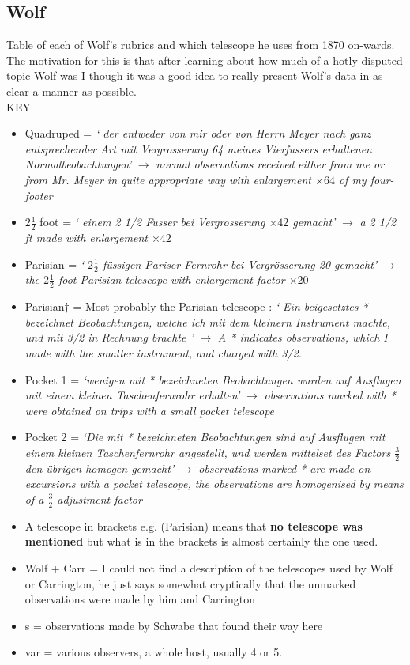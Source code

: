 \documentclass[12pt]{article}
\begin{document}
\subsection{Wolf}
Table of each of Wolf's rubrics and which telescope he uses from 1870 on-wards. The motivation for this is that after learning about how much of a hotly disputed topic Wolf was I though it was a good idea to really present Wolf's data in as clear a manner as possible.\\

KEY\\
\begin{itemize}[\ddagger]
    \item Quadruped = \textit{` der entweder von mir oder von Herrn Meyer nach ganz entsprechender Art mit Vergrosserung 64 meines Vierfussers erhaltenen Normalbeobachtungen'} $\longrightarrow$ \textit{normal observations received either from me or from Mr. Meyer in quite appropriate way with enlargement $\times 64$ of my four-footer}
    \item $2\frac{1}{2}$ foot = \textit{` einem 2 1/2 Fusser bei Vergrosserung $\times 42$ gemacht'} $\longrightarrow$ \textit{a 2 1/2 ft made with enlargement $\times 42$}
    \item Parisian = \textit{` $2\frac{1}{2}$ füssigen Pariser-Fernrohr bei Vergrösserung 20 gemacht'} $\longrightarrow$ \textit{the $2\frac{1}{2}$ foot Parisian telescope with enlargement factor $\times 20$}
    \item Parisian$\dagger$ = Most probably the Parisian telescope : \textit{` Ein beigesetztes * bezeichnet Beobachtungen, welche ich mit dem kleinern Instrument machte, und mit 3/2 in Rechnung brachte '} $\longrightarrow$ \textit{A * indicates observations, which I made with the smaller instrument, and charged with 3/2.}
    \item Pocket 1 = \textit{`wenigen mit * bezeichneten Beobachtungen wurden auf Ausflugen mit einem kleinen Taschenfernrohr erhalten'} $\longrightarrow$ \textit{observations marked with * were obtained on trips with a small pocket telescope}
    \item Pocket 2 = \textit{`Die mit * bezeichneten Beobachtungen sind auf Ausflugen mit einem kleinen Taschenfernrohr angestellt, und werden mittelset des Factors $\frac{3}{2}$ den übrigen homogen gemacht'} $\longrightarrow$ \textit{observations marked * are made on excursions with a pocket telescope, the observations are homogenised by means of a $\frac{3}{2}$ adjustment factor}
    \item A telescope in brackets e.g. (Parisian) means that \textbf{no telescope was mentioned} but what is in the brackets is almost certainly the one used.
    \item Wolf + Carr = I could not find a description of the telescopes used by Wolf or Carrington, he just says somewhat cryptically that the unmarked observations were made by him and Carrington
    \item s = observations made by Schwabe that found their way here
    \item var = various observers, a whole host, usually 4 or 5. 
\end{itemize}
\end{document}
